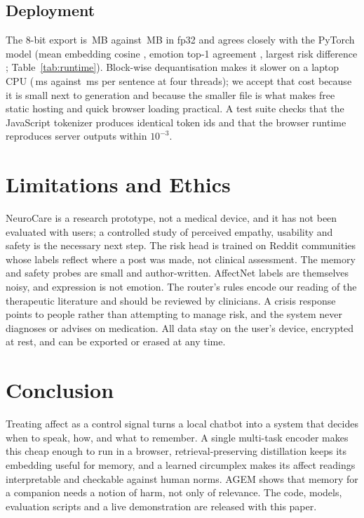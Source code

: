 \documentclass[conference]{IEEEtran}
\begin{document}


\subsection{Deployment}
The 8-bit export is \SizeQ\,MB against \SizeF\,MB in fp32 and agrees closely with the PyTorch model (mean embedding cosine \ParityCos, emotion top-1 agreement \ParityTop, largest risk difference \ParityRisk; Table~\ref{tab:runtime}). Block-wise dequantisation makes it slower on a laptop CPU (\LatQ\,ms against \LatF\,ms per sentence at four threads); we accept that cost because it is small next to generation and because the smaller file is what makes free static hosting and quick browser loading practical. A test suite checks that the JavaScript tokenizer produces identical token ids and that the browser runtime reproduces server outputs within $10^{-3}$.



\section{Limitations and Ethics}

NeuroCare is a research prototype, not a medical device, and it has not been evaluated with users; a controlled study of perceived empathy, usability and safety is the necessary next step. The risk head is trained on Reddit communities whose labels reflect where a post was made, not clinical assessment. The memory and safety probes are small and author-written. AffectNet labels are themselves noisy, and expression is not emotion. The router's rules encode our reading of the therapeutic literature and should be reviewed by clinicians. A crisis response points to people rather than attempting to manage risk, and the system never diagnoses or advises on medication. All data stay on the user's device, encrypted at rest, and can be exported or erased at any time.

\section{Conclusion}

Treating affect as a control signal turns a local chatbot into a system that decides when to speak, how, and what to remember. A single multi-task encoder makes this cheap enough to run in a browser, retrieval-preserving distillation keeps its embedding useful for memory, and a learned circumplex makes its affect readings interpretable and checkable against human norms. AGEM shows that memory for a companion needs a notion of harm, not only of relevance. The code, models, evaluation scripts and a live demonstration are released with this paper.



\end{document}
